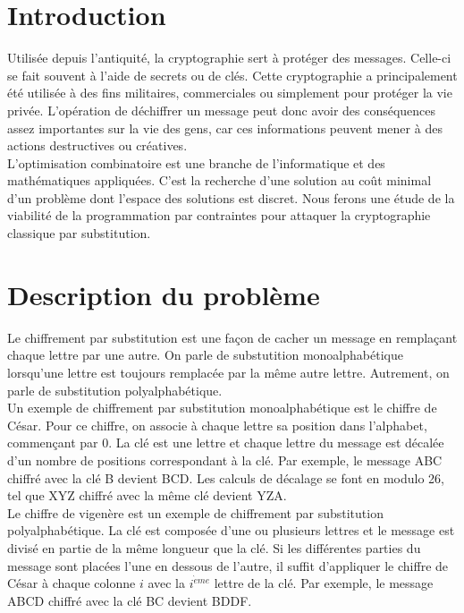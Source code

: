 \documentclass[11pt]{article}
\begin{document}
	
	\newpage

	\section{Introduction}

		Utilisée depuis l'antiquité, la cryptographie sert à protéger des messages. Celle-ci se fait souvent à l'aide de secrets ou de clés. Cette cryptographie a principalement été utilisée à des fins militaires, commerciales ou simplement pour protéger la vie privée. L'opération de déchiffrer un message peut donc avoir des conséquences assez importantes sur la vie des gens, car ces informations peuvent mener à des actions destructives ou créatives.\\

		L'optimisation combinatoire est une branche de l'informatique et des mathématiques appliquées. C'est la recherche d'une solution au coût minimal d'un problème dont l'espace des solutions est discret. Nous ferons une étude de la viabilité de la programmation par contraintes pour attaquer la cryptographie classique par substitution.\\

	\section{Description du problème}

		Le chiffrement par substitution est une façon de cacher un message en remplaçant chaque lettre par une autre. On parle de substutition monoalphabétique lorsqu'une lettre est toujours remplacée par la même autre lettre. Autrement, on parle de substitution polyalphabétique.\\

		Un exemple de chiffrement par substitution monoalphabétique est le chiffre de César. Pour ce chiffre, on associe à chaque lettre sa position dans l'alphabet, commençant par 0. La clé est une lettre et chaque lettre du message est décalée d'un nombre de positions correspondant à la clé. Par exemple, le message ABC chiffré avec la clé B devient BCD. Les calculs de décalage se font en modulo 26, tel que XYZ chiffré avec la même clé devient YZA.\\

		Le chiffre de vigenère est un exemple de chiffrement par substitution polyalphabétique. La clé est composée d'une ou plusieurs lettres et le message est divisé en partie de la même longueur que la clé. Si les différentes parties du message sont placées l'une en dessous de l'autre, il suffit d'appliquer le chiffre de César à chaque colonne $i$ avec la $i^{\grave{e}me}$ lettre de la clé. Par exemple, le message ABCD chiffré avec la clé BC devient BDDF.\\
\end{document}
